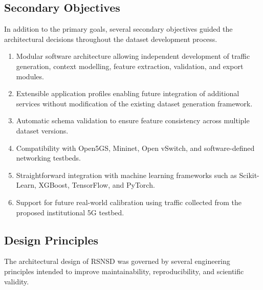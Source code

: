 \documentclass[12pt,a4paper]{article}
\begin{document}
\subsection{Secondary Objectives}

In addition to the primary goals, several secondary objectives guided the architectural decisions throughout the dataset development process.

\begin{enumerate}
	
	\item Modular software architecture allowing independent development of traffic generation, context modelling, feature extraction, validation, and export modules.
	
	\item Extensible application profiles enabling future integration of additional services without modification of the existing dataset generation framework.
	
	\item Automatic schema validation to ensure feature consistency across multiple dataset versions.
	
	\item Compatibility with Open5GS, Mininet, Open vSwitch, and software-defined networking testbeds.
	
	\item Straightforward integration with machine learning frameworks such as Scikit-Learn, XGBoost, TensorFlow, and PyTorch.
	
	\item Support for future real-world calibration using traffic collected from the proposed institutional 5G testbed.
	
\end{enumerate}

\subsection{Design Principles}

The architectural design of RSNSD was governed by several engineering principles intended to improve maintainability, reproducibility, and scientific validity.
\end{document}
